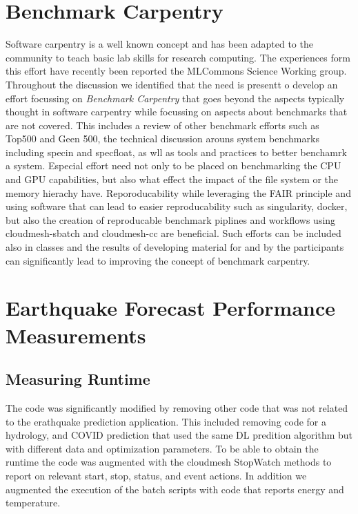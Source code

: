 \documentclass[utf8]{FrontiersinVancouver} %
\begin{document}
\section{Benchmark Carpentry}

Software carpentry \citep{software-carpentry} is a well known concept
and has been adapted to the community to teach basic lab skills for
research computing.  The experiences form this effort have recently
been reported the MLCommons Science Working group. Throughout the
discussion we identified that the need is presentt o develop an effort
focussing on {\em Benchmark Carpentry} that goes beyond the aspects
typically thought in software carpentry while focussing on aspects
about benchmarks that are not covered. This includes a review of other
benchmark efforts such as Top500 and Geen 500, the technical
discussion arouns system benchmarks including specin and specfloat, as
wll as tools and practices to better benchamrk a system. Especial
effort need not only to be placed on benchmarking the CPU and GPU
capabilities, but also what effect the impact of the file system or
the memory hierachy have. Reporoducability while leveraging the FAIR
principle and using software that can lead to easier reproducability
such as singularity, docker, but also the creation of reproducable
benchmark piplines and workflows using cloudmesh-sbatch and
cloudmesh-cc are beneficial. Such efforts can be included also in
classes and the results of developing material for and by the
participants can significantly lead to improving the concept of
benchmark carpentry.


\section{Earthquake Forecast Performance Measurements}
\label{sec:perf-main}


\subsection{Measuring Runtime}
\label{sec:perf-runtime}

The code was significantly modified by removing other code that was
not related to the erathquake prediction application. This included
removing code for a hydrology, and COVID prediction that used the same
DL predition algorithm but with different data and optimization
parameters. To be able to obtain the runtime the code was augmented
with the cloudmesh StopWatch methods to report on relevant start,
stop, status, and event actions. In addition we augmented the
execution of the batch scripts with code that reports energy and
temperature.
\end{document}
